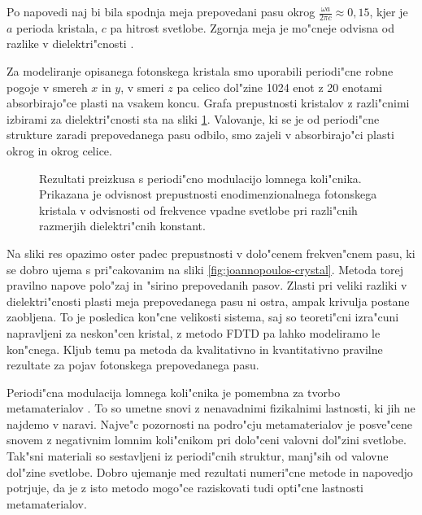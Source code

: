 \documentclass[12pt,twoside,openright,final,a4paper]{report}
\begin{document}
Po napovedi naj bi bila spodnja meja prepovedani pasu okrog $\frac{\omega a}{2\pi c} \approx 0,\!15$, kjer je $a$ perioda kristala, $c$ pa hitrost svetlobe. 
Zgornja meja je mo"cneje odvisna od razlike v dielektri"cnosti \cite{joannopoulos}. 

Za modeliranje opisanega fotonskega kristala smo uporabili periodi"cne robne pogoje v smereh $x$ in $y$, v smeri $z$ pa celico dol"zine 1024 enot z 20 enotami absorbirajo"ce plasti na vsakem koncu. 
Grafa prepustnosti kristalov z razli"cnimi izbirami za dielektri"cnosti sta na sliki \ref{fig:test-periodic}. 
Valovanje, ki se je od periodi"cne strukture zaradi prepovedanega pasu odbilo, smo zajeli v absorbirajo"ci plasti okrog in okrog celice. 

\begin{figure}[!htbp]
 
 \caption{Rezultati preizkusa s periodi"cno modulacijo lomnega koli"cnika. Prikazana je odvisnost prepustnosti enodimenzionalnega fotonskega kristala v odvisnosti od frekvence vpadne svetlobe pri razli"cnih razmerjih dielektri"cnih konstant. }
 \label{fig:test-periodic}
\end{figure}

Na sliki res opazimo oster padec prepustnosti v dolo"cenem frekven"cnem pasu, ki se dobro ujema s pri"cakovanim na sliki \ref{fig:joannopoulos-crystal}. 
Metoda torej pravilno napove polo"zaj in "sirino prepovedanih pasov. 
Zlasti pri veliki razliki v dielektri"cnosti plasti meja prepovedanega pasu ni ostra, ampak krivulja postane zaobljena. 
To je posledica kon"cne velikosti sistema, saj so teoreti"cni izra"cuni napravljeni za neskon"cen kristal, z metodo \acs{FDTD} pa lahko modeliramo le kon"cnega. 
Kljub temu pa metoda da kvalitativno in kvantitativno pravilne rezultate za pojav fotonskega prepovedanega pasu. 

Periodi"cna modulacija lomnega koli"cnika je pomembna za tvorbo metamaterialov \cite{metamaterials}. 
To so umetne snovi z nenavadnimi fizikalnimi lastnosti, ki jih ne najdemo v naravi. 
Najve"c pozornosti na podro"cju metamaterialov je posve"cene snovem z negativnim lomnim koli"cnikom pri dolo"ceni valovni dol"zini svetlobe. 
Tak"sni materiali so sestavljeni iz periodi"cnih struktur, manj"sih od valovne dol"zine svetlobe. 
Dobro ujemanje med rezultati numeri"cne metode in napovedjo potrjuje, da je z isto metodo mogo"ce raziskovati tudi opti"cne lastnosti metamaterialov. 
\end{document}
